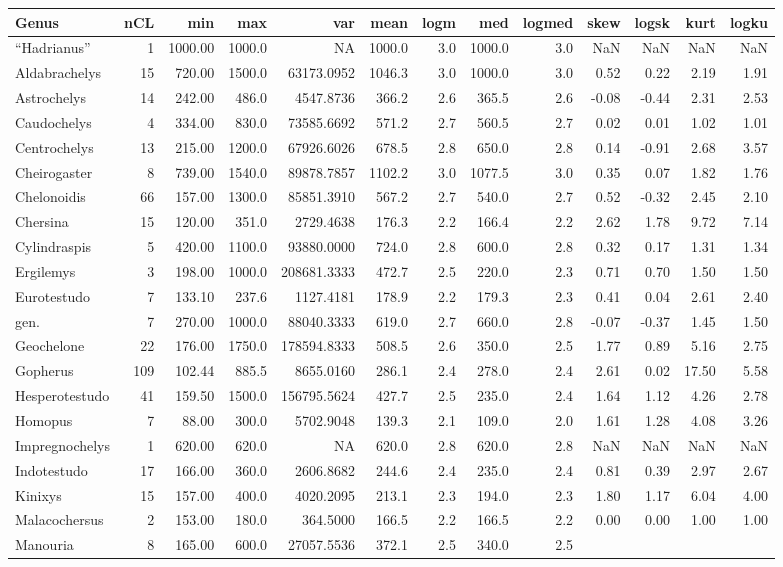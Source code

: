 \documentclass[]{article}
\begin{document}
\begin{longtable}[]{@{}lrrrrrrrrrrrr@{}}
\toprule
Genus & nCL & min & max & var & mean & logm & med & logmed & skew &
logsk & kurt & logku\tabularnewline
\midrule
\endhead
``Hadrianus'' & 1 & 1000.00 & 1000.0 & NA & 1000.0 & 3.0 & 1000.0 & 3.0
& NaN & NaN & NaN & NaN\tabularnewline
Aldabrachelys & 15 & 720.00 & 1500.0 & 63173.0952 & 1046.3 & 3.0 &
1000.0 & 3.0 & 0.52 & 0.22 & 2.19 & 1.91\tabularnewline
Astrochelys & 14 & 242.00 & 486.0 & 4547.8736 & 366.2 & 2.6 & 365.5 &
2.6 & -0.08 & -0.44 & 2.31 & 2.53\tabularnewline
Caudochelys & 4 & 334.00 & 830.0 & 73585.6692 & 571.2 & 2.7 & 560.5 &
2.7 & 0.02 & 0.01 & 1.02 & 1.01\tabularnewline
Centrochelys & 13 & 215.00 & 1200.0 & 67926.6026 & 678.5 & 2.8 & 650.0 &
2.8 & 0.14 & -0.91 & 2.68 & 3.57\tabularnewline
Cheirogaster & 8 & 739.00 & 1540.0 & 89878.7857 & 1102.2 & 3.0 & 1077.5
& 3.0 & 0.35 & 0.07 & 1.82 & 1.76\tabularnewline
Chelonoidis & 66 & 157.00 & 1300.0 & 85851.3910 & 567.2 & 2.7 & 540.0 &
2.7 & 0.52 & -0.32 & 2.45 & 2.10\tabularnewline
Chersina & 15 & 120.00 & 351.0 & 2729.4638 & 176.3 & 2.2 & 166.4 & 2.2 &
2.62 & 1.78 & 9.72 & 7.14\tabularnewline
Cylindraspis & 5 & 420.00 & 1100.0 & 93880.0000 & 724.0 & 2.8 & 600.0 &
2.8 & 0.32 & 0.17 & 1.31 & 1.34\tabularnewline
Ergilemys & 3 & 198.00 & 1000.0 & 208681.3333 & 472.7 & 2.5 & 220.0 &
2.3 & 0.71 & 0.70 & 1.50 & 1.50\tabularnewline
Eurotestudo & 7 & 133.10 & 237.6 & 1127.4181 & 178.9 & 2.2 & 179.3 & 2.3
& 0.41 & 0.04 & 2.61 & 2.40\tabularnewline
gen. & 7 & 270.00 & 1000.0 & 88040.3333 & 619.0 & 2.7 & 660.0 & 2.8 &
-0.07 & -0.37 & 1.45 & 1.50\tabularnewline
Geochelone & 22 & 176.00 & 1750.0 & 178594.8333 & 508.5 & 2.6 & 350.0 &
2.5 & 1.77 & 0.89 & 5.16 & 2.75\tabularnewline
Gopherus & 109 & 102.44 & 885.5 & 8655.0160 & 286.1 & 2.4 & 278.0 & 2.4
& 2.61 & 0.02 & 17.50 & 5.58\tabularnewline
Hesperotestudo & 41 & 159.50 & 1500.0 & 156795.5624 & 427.7 & 2.5 &
235.0 & 2.4 & 1.64 & 1.12 & 4.26 & 2.78\tabularnewline
Homopus & 7 & 88.00 & 300.0 & 5702.9048 & 139.3 & 2.1 & 109.0 & 2.0 &
1.61 & 1.28 & 4.08 & 3.26\tabularnewline
Impregnochelys & 1 & 620.00 & 620.0 & NA & 620.0 & 2.8 & 620.0 & 2.8 &
NaN & NaN & NaN & NaN\tabularnewline
Indotestudo & 17 & 166.00 & 360.0 & 2606.8682 & 244.6 & 2.4 & 235.0 &
2.4 & 0.81 & 0.39 & 2.97 & 2.67\tabularnewline
Kinixys & 15 & 157.00 & 400.0 & 4020.2095 & 213.1 & 2.3 & 194.0 & 2.3 &
1.80 & 1.17 & 6.04 & 4.00\tabularnewline
Malacochersus & 2 & 153.00 & 180.0 & 364.5000 & 166.5 & 2.2 & 166.5 &
2.2 & 0.00 & 0.00 & 1.00 & 1.00\tabularnewline
Manouria & 8 & 165.00 & 600.0 & 27057.5536 & 372.1 & 2.5 & 340.0 & 2.5 &

\end{longtable}
\end{document}
